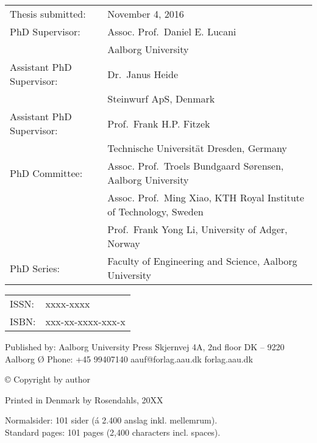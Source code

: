\thispagestyle{empty}
\noindent
\begin{tabularx}{\textwidth}{@{}lX}
    Thesis submitted: & November 4, 2016\\
    PhD Supervisor: & Assoc. Prof.\ Daniel E. Lucani\\
                    & Aalborg University\\
    Assistant PhD Supervisor: & Dr.\ Janus Heide\\
                    & Steinwurf ApS, Denmark\\
    Assistant PhD Supervisor: & Prof.\ Frank H.P. Fitzek\\
                    & Technische Universit\"{a}t Dresden, Germany\\
    PhD Committee: & Assoc. Prof.\ Troels Bundgaard S\o rensen, Aalborg University\\
                   & Assoc. Prof.\ Ming Xiao, KTH Royal Institute of Technology, Sweden\\
                   & Prof.\ Frank Yong Li, University of Adger, Norway\\
    PhD Series:    & Faculty of Engineering and Science, Aalborg University\\
\end{tabularx}
\strut\vfill
\noindent
\begin{tabularx}{\textwidth}{@{}lX}
    ISSN: & xxxx-xxxx\\
    ISBN: & xxx-xx-xxxx-xxx-x\\
\end{tabularx}
\strut\vfill
\noindent Published by:\newline
Aalborg University Press\newline
Skjernvej 4A, 2nd floor\newline
DK – 9220 Aalborg Ø\newline
Phone: +45 99407140\newline
aauf@forlag.aau.dk\newline
forlag.aau.dk
\strut\vfill
\noindent \copyright{} Copyright by author\newline
\strut\vfill
\noindent Printed in Denmark by Rosendahls, 20XX
\strut\vfill\vfill\vfill
\noindent Normalsider: 101 sider (á 2.400 anslag inkl. mellemrum).\\
Standard pages: 101 pages (2,400 characters incl. spaces).
\clearpage

